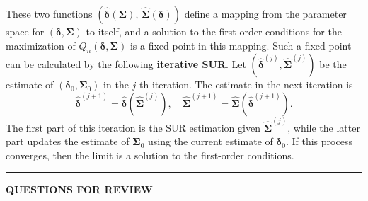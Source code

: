 These two functions $(\hat{\boldsymbol{\delta}}(\boldsymbol{\Sigma}),\, \hat{\boldsymbol{\Sigma}}(\boldsymbol{\delta}))$ define a mapping from the parameter space
for $(\boldsymbol{\delta}, \boldsymbol{\Sigma})$ to itself, and a solution to the first-order conditions for the maximization
of $Q_n(\boldsymbol{\delta}, \boldsymbol{\Sigma})$ is a fixed point in this mapping. Such a fixed point can be calculated
by the following \textbf{iterative SUR}. Let
$(\hat{\boldsymbol{\delta}}^{(j)}, \hat{\boldsymbol{\Sigma}}^{(j)})$ be the estimate of
$(\boldsymbol{\delta}_0, \boldsymbol{\Sigma}_0)$ in the
$j$-th iteration. The estimate in the next iteration is
\begin{equation}
  \hat{\boldsymbol{\delta}}^{(j+1)} = \hat{\boldsymbol{\delta}}(\hat{\boldsymbol{\Sigma}}^{(j)}), \quad
  \hat{\boldsymbol{\Sigma}}^{(j+1)} = \hat{\boldsymbol{\Sigma}}(\hat{\boldsymbol{\delta}}^{(j+1)}).
  \label{eq:8.5.33} \tag{8.5.33}
\end{equation}
The first part of this iteration is the SUR estimation given $\hat{\boldsymbol{\Sigma}}^{(j)}$, while the latter
part updates the estimate of $\boldsymbol{\Sigma}_0$ using the current estimate of $\boldsymbol{\delta}_0$. If this process
converges, then the limit is a solution to the first-order conditions.

\bigskip
\noindent\rule{\textwidth}{0.4pt}
\textbf{QUESTIONS FOR REVIEW}
\medskip


